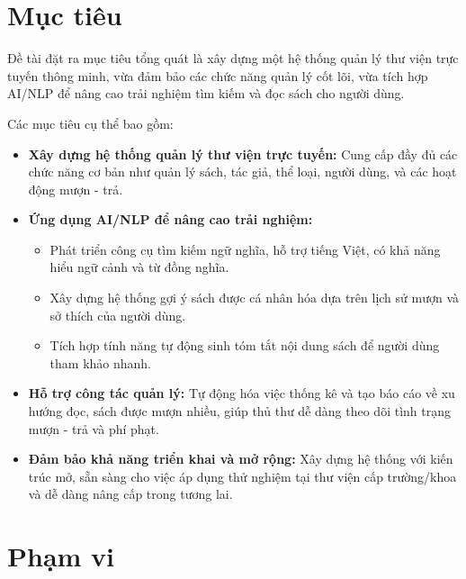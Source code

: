 \section{Mục tiêu}
\label{sec:MucTieu}

Đề tài đặt ra mục tiêu tổng quát là xây dựng một hệ thống quản lý thư viện trực tuyến thông minh, vừa đảm bảo các chức năng quản lý cốt lõi, vừa tích hợp AI/NLP để nâng cao trải nghiệm tìm kiếm và đọc sách cho người dùng.

Các mục tiêu cụ thể bao gồm:
\begin{itemize}
    \item \textbf{Xây dựng hệ thống quản lý thư viện trực tuyến:} Cung cấp đầy đủ các chức năng cơ bản như quản lý sách, tác giả, thể loại, người dùng, và các hoạt động mượn - trả.
    \item \textbf{Ứng dụng AI/NLP để nâng cao trải nghiệm:}
    \begin{itemize}
        \item Phát triển công cụ tìm kiếm ngữ nghĩa, hỗ trợ tiếng Việt, có khả năng hiểu ngữ cảnh và từ đồng nghĩa.
        \item Xây dựng hệ thống gợi ý sách được cá nhân hóa dựa trên lịch sử mượn và sở thích của người dùng.
        \item Tích hợp tính năng tự động sinh tóm tắt nội dung sách để người dùng tham khảo nhanh.
    \end{itemize}
    \item \textbf{Hỗ trợ công tác quản lý:} Tự động hóa việc thống kê và tạo báo cáo về xu hướng đọc, sách được mượn nhiều, giúp thủ thư dễ dàng theo dõi tình trạng mượn - trả và phí phạt.
    \item \textbf{Đảm bảo khả năng triển khai và mở rộng:} Xây dựng hệ thống với kiến trúc mở, sẵn sàng cho việc áp dụng thử nghiệm tại thư viện cấp trường/khoa và dễ dàng nâng cấp trong tương lai.
\end{itemize}

\section{Phạm vi}
\label{sec:PhamVi}


